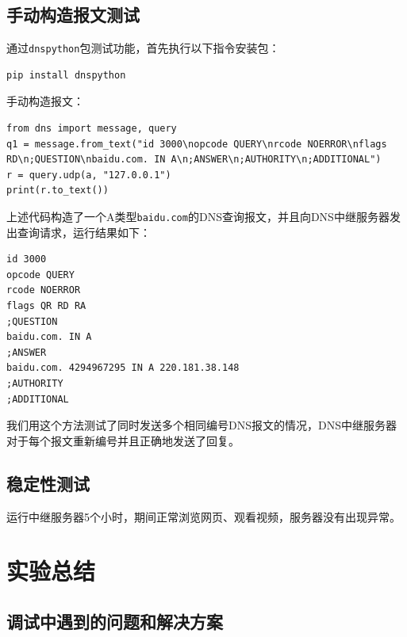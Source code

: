 \documentclass[lang=cn,11pt,a4paper,cite=authornum]{paper}
\begin{document}
\subsection{手动构造报文测试}

通过\texttt{dnspython}包测试功能，首先执行以下指令安装包：

\begin{code}
\begin{verbatim}
pip install dnspython
\end{verbatim}
\end{code}

手动构造报文：

\begin{code}
\begin{verbatim}
from dns import message, query
q1 = message.from_text("id 3000\nopcode QUERY\nrcode NOERROR\nflags RD\n;QUESTION\nbaidu.com. IN A\n;ANSWER\n;AUTHORITY\n;ADDITIONAL")
r = query.udp(a, "127.0.0.1")
print(r.to_text())
\end{verbatim}
\end{code}

上述代码构造了一个A类型\texttt{baidu.com}的DNS查询报文，并且向DNS中继服务器发出查询请求，运行结果如下：

\begin{code}
\begin{verbatim}
id 3000
opcode QUERY
rcode NOERROR
flags QR RD RA
;QUESTION
baidu.com. IN A
;ANSWER
baidu.com. 4294967295 IN A 220.181.38.148
;AUTHORITY
;ADDITIONAL
\end{verbatim}
\end{code}

我们用这个方法测试了同时发送多个相同编号DNS报文的情况，DNS中继服务器对于每个报文重新编号并且正确地发送了回复。

\subsection{稳定性测试}

运行中继服务器5个小时，期间正常浏览网页、观看视频，服务器没有出现异常。

\section{实验总结}

\subsection{调试中遇到的问题和解决方案}
\end{document}

